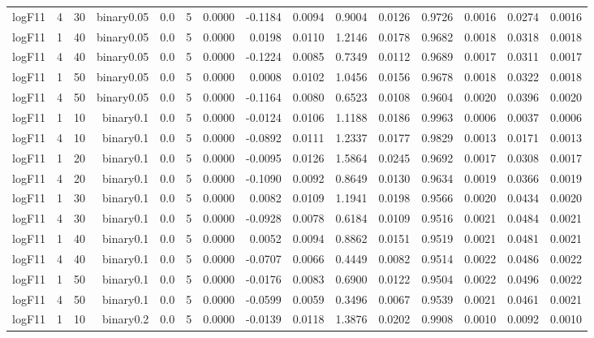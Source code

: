 \begin{longtable}{rrrrrrrrrrrrrrr}
  logF11 & 4 & 30 & binary0.05 & 0.0 & 5 & 0.0000 & -0.1184 & 0.0094 & 0.9004 & 0.0126 & 0.9726 & 0.0016 & 0.0274 & 0.0016 \\ 
  logF11 & 1 & 40 & binary0.05 & 0.0 & 5 & 0.0000 & 0.0198 & 0.0110 & 1.2146 & 0.0178 & 0.9682 & 0.0018 & 0.0318 & 0.0018 \\ 
  logF11 & 4 & 40 & binary0.05 & 0.0 & 5 & 0.0000 & -0.1224 & 0.0085 & 0.7349 & 0.0112 & 0.9689 & 0.0017 & 0.0311 & 0.0017 \\ 
  logF11 & 1 & 50 & binary0.05 & 0.0 & 5 & 0.0000 & 0.0008 & 0.0102 & 1.0456 & 0.0156 & 0.9678 & 0.0018 & 0.0322 & 0.0018 \\ 
  logF11 & 4 & 50 & binary0.05 & 0.0 & 5 & 0.0000 & -0.1164 & 0.0080 & 0.6523 & 0.0108 & 0.9604 & 0.0020 & 0.0396 & 0.0020 \\ 
  logF11 & 1 & 10 & binary0.1 & 0.0 & 5 & 0.0000 & -0.0124 & 0.0106 & 1.1188 & 0.0186 & 0.9963 & 0.0006 & 0.0037 & 0.0006 \\ 
  logF11 & 4 & 10 & binary0.1 & 0.0 & 5 & 0.0000 & -0.0892 & 0.0111 & 1.2337 & 0.0177 & 0.9829 & 0.0013 & 0.0171 & 0.0013 \\ 
  logF11 & 1 & 20 & binary0.1 & 0.0 & 5 & 0.0000 & -0.0095 & 0.0126 & 1.5864 & 0.0245 & 0.9692 & 0.0017 & 0.0308 & 0.0017 \\ 
  logF11 & 4 & 20 & binary0.1 & 0.0 & 5 & 0.0000 & -0.1090 & 0.0092 & 0.8649 & 0.0130 & 0.9634 & 0.0019 & 0.0366 & 0.0019 \\ 
  logF11 & 1 & 30 & binary0.1 & 0.0 & 5 & 0.0000 & 0.0082 & 0.0109 & 1.1941 & 0.0198 & 0.9566 & 0.0020 & 0.0434 & 0.0020 \\ 
  logF11 & 4 & 30 & binary0.1 & 0.0 & 5 & 0.0000 & -0.0928 & 0.0078 & 0.6184 & 0.0109 & 0.9516 & 0.0021 & 0.0484 & 0.0021 \\ 
  logF11 & 1 & 40 & binary0.1 & 0.0 & 5 & 0.0000 & 0.0052 & 0.0094 & 0.8862 & 0.0151 & 0.9519 & 0.0021 & 0.0481 & 0.0021 \\ 
  logF11 & 4 & 40 & binary0.1 & 0.0 & 5 & 0.0000 & -0.0707 & 0.0066 & 0.4449 & 0.0082 & 0.9514 & 0.0022 & 0.0486 & 0.0022 \\ 
  logF11 & 1 & 50 & binary0.1 & 0.0 & 5 & 0.0000 & -0.0176 & 0.0083 & 0.6900 & 0.0122 & 0.9504 & 0.0022 & 0.0496 & 0.0022 \\ 
  logF11 & 4 & 50 & binary0.1 & 0.0 & 5 & 0.0000 & -0.0599 & 0.0059 & 0.3496 & 0.0067 & 0.9539 & 0.0021 & 0.0461 & 0.0021 \\ 
  logF11 & 1 & 10 & binary0.2 & 0.0 & 5 & 0.0000 & -0.0139 & 0.0118 & 1.3876 & 0.0202 & 0.9908 & 0.0010 & 0.0092 & 0.0010 \\ 

\end{longtable}
